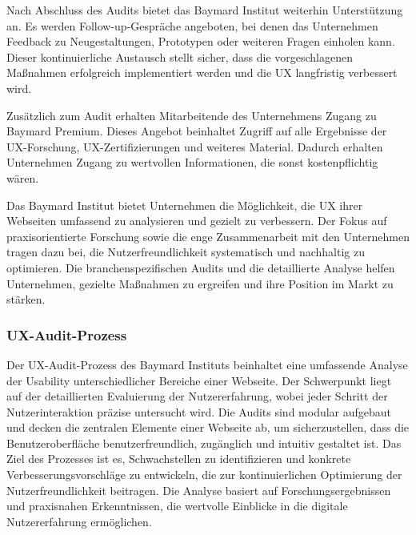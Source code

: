 Nach Abschluss des Audits bietet das Baymard Institut weiterhin Unterstützung an. Es werden Follow-up-Gespräche angeboten, bei denen das Unternehmen Feedback zu Neugestaltungen, Prototypen oder weiteren Fragen einholen kann. Dieser kontinuierliche Austausch stellt sicher, dass die vorgeschlagenen Maßnahmen erfolgreich implementiert werden und die UX langfristig verbessert wird.

Zusätzlich zum Audit erhalten Mitarbeitende des Unternehmens Zugang zu Baymard Premium. Dieses Angebot beinhaltet Zugriff auf alle Ergebnisse der UX-Forschung, UX-Zertifizierungen und weiteres Material. Dadurch erhalten Unternehmen Zugang zu wertvollen Informationen, die sonst kostenpflichtig wären.

Das Baymard Institut bietet Unternehmen die Möglichkeit, die UX ihrer Webseiten umfassend zu analysieren und gezielt zu verbessern. Der Fokus auf praxisorientierte Forschung sowie die enge Zusammenarbeit mit den Unternehmen tragen dazu bei, die Nutzerfreundlichkeit systematisch und nachhaltig zu optimieren. Die branchenspezifischen Audits und die detaillierte Analyse helfen Unternehmen, gezielte Maßnahmen zu ergreifen und ihre Position im Markt zu stärken.


\subsubsection{UX-Audit-Prozess}
\label{ux_audit_prozess}

Der UX-Audit-Prozess des Baymard Instituts beinhaltet eine umfassende Analyse der Usability unterschiedlicher Bereiche einer Webseite. Der Schwerpunkt liegt auf der detaillierten Evaluierung der Nutzererfahrung, wobei jeder Schritt der Nutzerinteraktion präzise untersucht wird. Die Audits sind modular aufgebaut und decken die zentralen Elemente einer Webseite ab, um sicherzustellen, dass die Benutzeroberfläche benutzerfreundlich, zugänglich und intuitiv gestaltet ist. Das Ziel des Prozesses ist es, Schwachstellen zu identifizieren und konkrete Verbesserungsvorschläge zu entwickeln, die zur kontinuierlichen Optimierung der Nutzerfreundlichkeit beitragen. Die Analyse basiert auf Forschungsergebnissen und praxisnahen Erkenntnissen, die wertvolle Einblicke in die digitale Nutzererfahrung ermöglichen.

